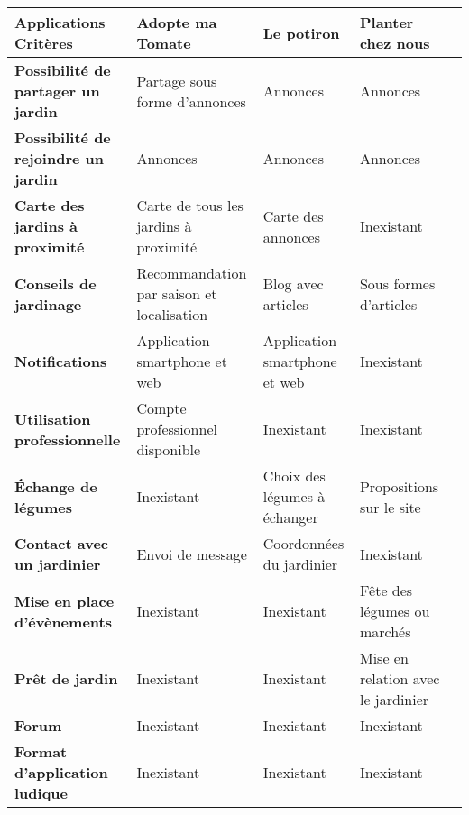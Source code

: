 \documentclass{report}
\begin{document}
\begin{tabular}{|p{3cm}|p{3cm}|p{3cm}|p{3cm}|p{3cm}|}
    \hline
    \textbf{Applications Critères} & \textbf{Adopte ma Tomate} & \textbf{Le potiron} & \textbf{Planter chez nous}
    \\ \hline
    \textbf{Possibilité de partager un jardin} & Partage sous forme d’annonces & Annonces & Annonces 
    \\ \hline
   \textbf{Possibilité de rejoindre un jardin} & Annonces & Annonces & Annonces  
    \\ \hline
   \textbf{Carte des jardins à proximité} & Carte de tous les jardins à proximité & Carte des annonces & Inexistant 
    \\ \hline
   \textbf{Conseils de jardinage} & Recommandation par saison et localisation & Blog avec articles & Sous formes d’articles 
    \\ \hline
    \textbf{Notifications} & Application smartphone et web & Application smartphone et web & Inexistant 
    \\ \hline
    \textbf{Utilisation professionnelle} & Compte professionnel disponible & Inexistant & Inexistant 
    \\ \hline
    \textbf{Échange de légumes} & Inexistant & Choix des légumes à échanger & Propositions sur le site 
    \\ \hline
    \textbf{Contact avec un jardinier} & Envoi de message & Coordonnées du jardinier & Inexistant 
    \\ \hline
   \textbf{Mise en place d’évènements} & Inexistant & Inexistant & Fête des légumes ou marchés 
    \\ \hline
    \textbf{Prêt de jardin} & Inexistant & Inexistant & Mise en relation avec le jardinier 
    \\ \hline
   \textbf{Forum} & Inexistant & Inexistant & Inexistant 
    \\ \hline
    \textbf{Format d'application ludique} & Inexistant & Inexistant & Inexistant 
    \\ \hline
\end{tabular}

\vspace{0.5cm} \\
\end{document}
